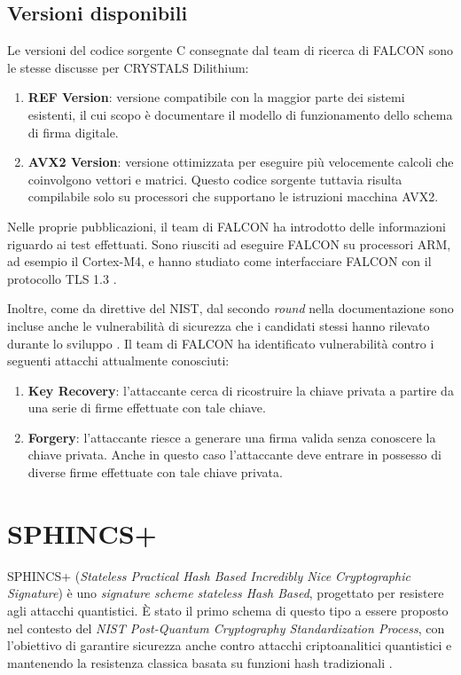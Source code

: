 \subsection{Versioni disponibili}

Le versioni del codice sorgente C consegnate dal team di ricerca di FALCON sono le stesse discusse per CRYSTALS Dilithium:
\begin{enumerate}
    \item \textbf{REF Version}: versione compatibile con la maggior parte dei sistemi esistenti, il cui scopo è documentare il modello di funzionamento dello schema di firma digitale.
    \item \textbf{AVX2 Version}: versione ottimizzata per eseguire più velocemente calcoli che coinvolgono vettori e matrici. Questo codice sorgente tuttavia risulta compilabile solo su processori che supportano le istruzioni macchina AVX2.
\end{enumerate}

Nelle proprie pubblicazioni, il team di FALCON ha introdotto delle informazioni riguardo ai test effettuati. Sono riusciti ad eseguire FALCON su processori ARM, ad esempio il Cortex-M4, e hanno studiato come interfacciare FALCON con il protocollo TLS 1.3 \cite{falcon-submissionpackage-three}.

Inoltre, come da direttive del NIST, dal secondo \textit{round} nella documentazione sono incluse anche le vulnerabilità di sicurezza che i candidati stessi hanno rilevato durante lo sviluppo \cite{falcon-submissionpackage-three}. Il team di FALCON ha identificato vulnerabilità contro i seguenti attacchi attualmente conosciuti:
\begin{enumerate}
    \item \textbf{Key Recovery}: l'attaccante cerca di ricostruire la chiave privata a partire da una serie di firme effettuate con tale chiave.
    \item \textbf{Forgery}: l'attaccante riesce a generare una firma valida senza conoscere la chiave privata. Anche in questo caso l'attaccante deve entrare in possesso di diverse firme effettuate con tale chiave privata.
\end{enumerate}

\section{SPHINCS+}

SPHINCS+ (\textit{Stateless Practical Hash Based Incredibly Nice Cryptographic Signature}) è uno \textit{signature scheme stateless Hash Based}, progettato per resistere agli attacchi quantistici. È stato il primo schema di questo tipo a essere proposto nel contesto del \textit{NIST Post-Quantum Cryptography Standardization Process}\cite{nist-pqc}, con l'obiettivo di garantire sicurezza anche contro attacchi criptoanalitici quantistici e mantenendo la resistenza classica basata su funzioni hash tradizionali \cite{sphincs-plus-website}.

